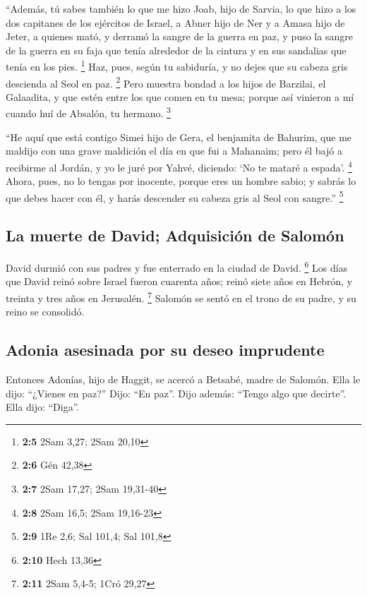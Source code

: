  ``Además, tú sabes también lo que me hizo Joab, hijo de
Sarvia, lo que hizo a los dos capitanes de los ejércitos de Israel, a
Abner hijo de Ner y a Amasa hijo de Jeter, a quienes mató, y derramó la
sangre de la guerra en paz, y puso la sangre de la guerra en su faja que
tenía alrededor de la cintura y en sus sandalias que tenía en los pies.
\footnote{\textbf{2:5} 2Sam 3,27; 2Sam 20,10}  Haz, pues,
según tu sabiduría, y no dejes que su cabeza gris descienda al Seol en
paz. \footnote{\textbf{2:6} Gén 42,38}  Pero muestra
bondad a los hijos de Barzilai, el Galaadita, y que estén entre los que
comen en tu mesa; porque así vinieron a mí cuando huí de Absalón, tu
hermano. \footnote{\textbf{2:7} 2Sam 17,27; 2Sam 19,31-40}

 ``He aquí que está contigo Simei hijo de Gera, el
benjamita de Bahurim, que me maldijo con una grave maldición el día en
que fui a Mahanaim; pero él bajó a recibirme al Jordán, y yo le juré por
Yahvé, diciendo: `No te mataré a espada'. \footnote{\textbf{2:8} 2Sam
  16,5; 2Sam 19,16-23}  Ahora, pues, no lo tengas por
inocente, porque eres un hombre sabio; y sabrás lo que debes hacer con
él, y harás descender su cabeza gris al Seol con sangre.'' \footnote{\textbf{2:9}
  1Re 2,6; Sal 101,4; Sal 101,8}

\hypertarget{la-muerte-de-david-adquisiciuxf3n-de-salomuxf3n}{%
\subsection{La muerte de David; Adquisición de
Salomón}\label{la-muerte-de-david-adquisiciuxf3n-de-salomuxf3n}}

 David durmió con sus padres y fue enterrado en la ciudad
de David. \footnote{\textbf{2:10} Hech 13,36}  Los días
que David reinó sobre Israel fueron cuarenta años; reinó siete años en
Hebrón, y treinta y tres años en Jerusalén. \footnote{\textbf{2:11} 2Sam
  5,4-5; 1Cró 29,27}  Salomón se sentó en el trono de su
padre, y su reino se consolidó.

\hypertarget{adonia-asesinada-por-su-deseo-imprudente}{%
\subsection{Adonia asesinada por su deseo
imprudente}\label{adonia-asesinada-por-su-deseo-imprudente}}

 Entonces Adonías, hijo de Haggit, se acercó a Betsabé,
madre de Salomón. Ella le dijo: ``¿Vienes en paz?'' Dijo: ``En paz''.
 Dijo además: ``Tengo algo que decirte''. Ella dijo:
``Diga''.


